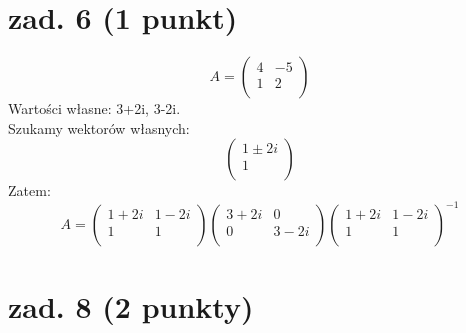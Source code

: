 \documentclass{article}
\begin{document}
\section{zad. 6 (1 punkt)}
$$
A=
\begin{pmatrix}
4 & -5\\
1 & 2\\
\end{pmatrix}
$$
Wartości własne: 3+2i, 3-2i.\\
Szukamy wektorów własnych:
$$
\begin{pmatrix}
1 \pm 2i\\
1\\
\end{pmatrix}
$$
Zatem:
$$
A =
\begin{pmatrix}
1 + 2i & 1 - 2i\\
1 & 1\\
\end{pmatrix}
\begin{pmatrix}
3 + 2i & 0\\
0 & 3 - 2i\\
\end{pmatrix}
\begin{pmatrix}
1 + 2i & 1 - 2i\\
1 & 1\\
\end{pmatrix}^{-1}
$$
\section{zad. 8 (2 punkty)}
\end{document}
